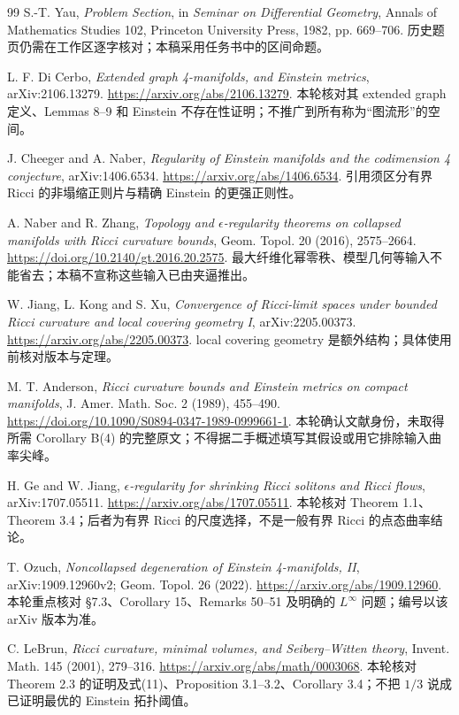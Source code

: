 \documentclass[UTF8,a4paper,11pt,fontset=fandol]{ctexart}
\numberwithin{equation}{section}
\theoremstyle{definition}
\begin{document}
\begin{thebibliography}{99}
 S.-T. Yau, \emph{Problem Section}, in \emph{Seminar on Differential Geometry}, Annals of Mathematics Studies 102, Princeton University Press, 1982, pp. 669--706. 历史题页仍需在工作区逐字核对；本稿采用任务书中的区间命题。

 L. F. Di Cerbo, \emph{Extended graph 4-manifolds, and Einstein metrics}, arXiv:2106.13279. \url{https://arxiv.org/abs/2106.13279}. 本轮核对其 extended graph 定义、Lemmas 8--9 和 Einstein 不存在性证明；不推广到所有称为“图流形”的空间。

 J. Cheeger and A. Naber, \emph{Regularity of Einstein manifolds and the codimension 4 conjecture}, arXiv:1406.6534. \url{https://arxiv.org/abs/1406.6534}. 引用须区分有界 Ricci 的非塌缩正则片与精确 Einstein 的更强正则性。

 A. Naber and R. Zhang, \emph{Topology and $\epsilon$-regularity theorems on collapsed manifolds with Ricci curvature bounds}, Geom. Topol. 20 (2016), 2575--2664. \url{https://doi.org/10.2140/gt.2016.20.2575}. 最大纤维化幂零秩、模型几何等输入不能省去；本稿不宣称这些输入已由夹逼推出。

 W. Jiang, L. Kong and S. Xu, \emph{Convergence of Ricci-limit spaces under bounded Ricci curvature and local covering geometry I}, arXiv:2205.00373. \url{https://arxiv.org/abs/2205.00373}. local covering geometry 是额外结构；具体使用前核对版本与定理。

 M. T. Anderson, \emph{Ricci curvature bounds and Einstein metrics on compact manifolds}, J. Amer. Math. Soc. 2 (1989), 455--490. \url{https://doi.org/10.1090/S0894-0347-1989-0999661-1}. 本轮确认文献身份，未取得所需 Corollary B(4) 的完整原文；不得据二手概述填写其假设或用它排除输入曲率尖峰。

 H. Ge and W. Jiang, \emph{$\epsilon$-regularity for shrinking Ricci solitons and Ricci flows}, arXiv:1707.05511. \url{https://arxiv.org/abs/1707.05511}. 本轮核对 Theorem 1.1、Theorem 3.4；后者为有界 Ricci 的尺度选择，不是一般有界 Ricci 的点态曲率结论。

 T. Ozuch, \emph{Noncollapsed degeneration of Einstein 4-manifolds, II}, arXiv:1909.12960v2; Geom. Topol. 26 (2022). \url{https://arxiv.org/abs/1909.12960}. 本轮重点核对 \S7.3、Corollary 15、Remarks 50--51 及明确的 $L^\infty$ 问题；编号以该 arXiv 版本为准。

 C. LeBrun, \emph{Ricci curvature, minimal volumes, and Seiberg--Witten theory}, Invent. Math. 145 (2001), 279--316. \url{https://arxiv.org/abs/math/0003068}. 本轮核对 Theorem 2.3 的证明及式(11)、Proposition 3.1--3.2、Corollary 3.4；不把 $1/3$ 说成已证明最优的 Einstein 拓扑阈值。


\end{thebibliography}
\end{document}

